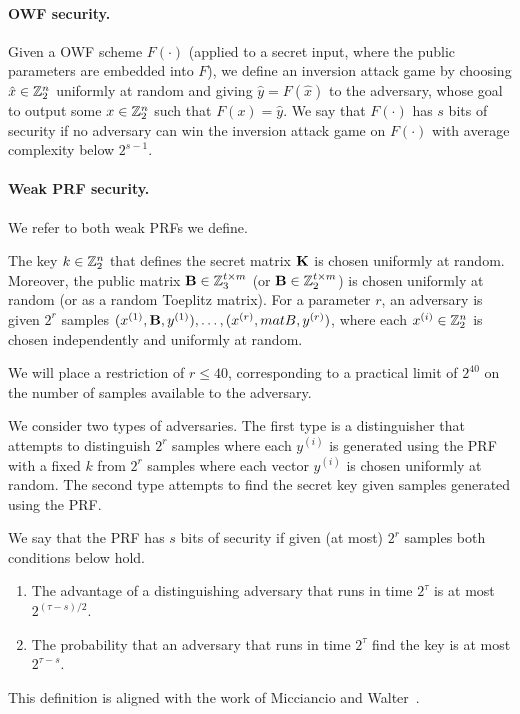 \paragraph{OWF security.}
Given a OWF scheme $F(\cdot)$ (applied to a secret input, where the public parameters are embedded into $F$),
we define an inversion attack game by choosing $\hat{x} \in \mathbb{Z}_2^n$
uniformly at random and giving $\hat{y}= F(\hat{x})$ to the adversary, whose
goal to output some $x \in \mathbb{Z}_2^n$ such that $F(x) = \hat{y}$.
We say that $F(\cdot)$ has $s$ bits of security if no adversary can win the inversion attack game on $F(\cdot)$ with average complexity below $2^{s-1}$.


\paragraph{Weak PRF security.}
We refer to both weak PRFs we define.

The key $k \in \mathbb{Z}_2^n$ that defines the secret matrix $\mat{K}$ is chosen uniformly at random.
Moreover, the public matrix
$\mat{B} \in \Z_3^{t \times m}$ (or $\mat{B} \in \Z_2^{t \times m}$) is chosen uniformly at random
(or as a random Toeplitz matrix).
For a parameter $r$, an adversary is given $2^{r}$ samples $(x^{(1)},\mat{B},y^{(1)}) ,\ldots, (x^{(r)},
mat{B},y^{(r)})$,
where each $x^{(i)} \in \mathbb{Z}_2^n$ is chosen independently and uniformly at random.

We will place a restriction of $r \leq 40$,
corresponding to a practical limit of $2^{40}$ on the number of samples available to the adversary.

We consider two types of adversaries.
The first type is a distinguisher that attempts to distinguish $2^r$ samples where each $y^{(i)}$
is generated using the PRF with a fixed $k$ from
$2^r$ samples where each vector $y^{(i)}$ is chosen uniformly at random.
The second type attempts to find the secret key given samples generated using the PRF.

We say that the PRF has $s$ bits of security if given (at most) $2^r$ samples both conditions below hold.
\begin{enumerate}
  \item The advantage of a distinguishing adversary that runs in time $2^\tau$ is at most $2^{(\tau - s)/2}$.
  \item The probability that an adversary that runs in time $2^\tau$ find the key is at most $2^{\tau - s}$.
\end{enumerate}
This definition is aligned with the work of Micciancio and Walter~\cite{Micciancio018}.

